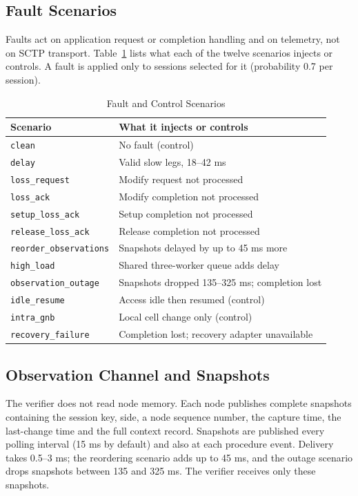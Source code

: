 \documentclass[conference]{IEEEtran}
\begin{document}
\subsection{Fault Scenarios}
Faults act on application request or completion handling and on telemetry, not on SCTP transport. Table~\ref{tab:scenarios} lists what each of the twelve scenarios injects or controls. A fault is applied only to sessions selected for it (probability 0.7 per session).
\begin{table}[t]
\caption{Fault and Control Scenarios}
\label{tab:scenarios}\centering\footnotesize
\begin{tabular}{p{}p{}}
\toprule Scenario & What it injects or controls\\\midrule
\texttt{clean} & No fault (control)\\
\texttt{delay} & Valid slow legs, 18--42 ms\\
\texttt{loss\_request} & Modify request not processed\\
\texttt{loss\_ack} & Modify completion not processed\\
\texttt{setup\_loss\_ack} & Setup completion not processed\\
\texttt{release\_loss\_ack} & Release completion not processed\\
\texttt{reorder\_observations} & Snapshots delayed by up to 45 ms more\\
\texttt{high\_load} & Shared three-worker queue adds delay\\
\texttt{observation\_outage} & Snapshots dropped 135--325 ms; completion lost\\
\texttt{idle\_resume} & Access idle then resumed (control)\\
\texttt{intra\_gnb} & Local cell change only (control)\\
\texttt{recovery\_failure} & Completion lost; recovery adapter unavailable\\\bottomrule
\end{tabular}
\end{table}

\subsection{Observation Channel and Snapshots}
The verifier does not read node memory. Each node publishes complete snapshots containing the session key, side, a node sequence number, the capture time, the last-change time and the full context record. Snapshots are published every polling interval (15 ms by default) and also at each procedure event. Delivery takes 0.5--3 ms; the reordering scenario adds up to 45 ms, and the outage scenario drops snapshots between 135 and 325 ms. The verifier receives only these snapshots.
\end{document}

